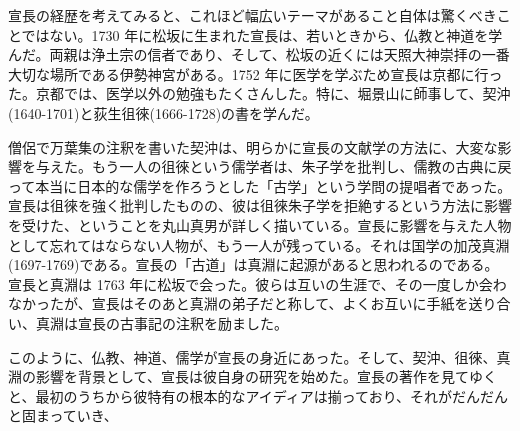 \documentclass[12pt]{report}
\begin{document}
宣長の経歴を考えてみると、これほど幅広いテーマがあること自体は驚くべきことではない。1730 年に松坂に生まれた宣長は、若いときから、仏教と神道を学んだ。両親は浄土宗の信者であり、そして、松坂の近くには天照大神崇拝の一番大切な場所である伊勢神宮がある。1752 年に医学を学ぶため宣長は京都に行った。京都では、医学以外の勉強もたくさんした。特に、堀景山に師事して、契沖(1640-1701)と荻生徂徠(1666-1728)の書を学んだ。

僧侶で万葉集の注釈を書いた契沖は、明らかに宣長の文献学の方法に、大変な影響を与えた。もう一人の徂徠という儒学者は、朱子学を批判し、儒教の古典に戻って本当に日本的な儒学を作ろうとした「古学」という学問の提唱者であった。宣長は徂徠を強く批判したものの、彼は徂徠朱子学を拒絶するという方法に影響を受けた、ということを丸山真男が詳しく描いている。宣長に影響を与えた人物として忘れてはならない人物が、もう一人が残っている。それは国学の加茂真淵(1697-1769)である。宣長の「古道」は真淵に起源があると思われるのである。宣長と真淵は 1763 年に松坂で会った。彼らは互いの生涯で、その一度しか会わなかったが、宣長はそのあと真淵の弟子だと称して、よくお互いに手紙を送り合い、真淵は宣長の古事記の注釈を励ました。

このように、仏教、神道、儒学が宣長の身近にあった。そして、契沖、徂徠、真淵の影響を背景として、宣長は彼自身の研究を始めた。宣長の著作を見てゆくと、最初のうちから彼特有の根本的なアイディアは揃っており、それがだんだんと固まっていき、
\end{document}

